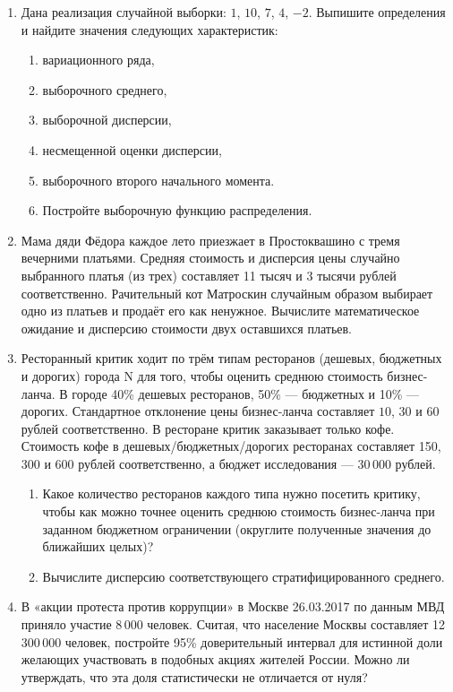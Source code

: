 \documentclass[12pt, a4paper]{article}\usepackage[]{graphicx}\usepackage[]{color}
\begin{document}
		\begin{enumerate}

			\item Дана реализация случайной выборки: $1$, $10$, $7$, $4$, $-2$. Выпишите определения и найдите значения следующих характеристик:
			\begin{enumerate}
				\item вариационного ряда,
				\item выборочного среднего,
				\item выборочной дисперсии,
				\item несмещенной оценки дисперсии,
				\item выборочного второго начального момента.
				\item Постройте выборочную функцию распределения.
			\end{enumerate}


			\item
			Мама дяди Фёдора каждое лето приезжает в Простоквашино с тремя вечерними платьями. Средняя стоимость и дисперсия цены случайно выбранного платья (из трех) составляет 11 тысяч и 3 тысячи рублей соответственно. Рачительный кот Матроскин случайным образом выбирает одно из платьев и продаёт его как ненужное. Вычислите математическое ожидание и дисперсию стоимости двух оставшихся платьев.

			\item
			Ресторанный критик ходит по трём типам ресторанов (дешевых, бюджетных и дорогих) города N для того, чтобы оценить среднюю стоимость бизнес-ланча. В городе 40\%
			дешевых ресторанов, 50\% — бюджетных и 10\% — дорогих. Стандартное отклонение цены бизнес-ланча составляет $10$, $30$ и $60$ рублей соответственно. В ресторане критик заказывает только кофе. Стоимость кофе в дешевых/бюджетных/дорогих ресторанах составляет 150, 300 и 600 рублей соответственно, а бюджет исследования — 30\,000 рублей.
			\begin{enumerate}
				\item Какое количество ресторанов каждого типа нужно посетить критику, чтобы как можно точнее оценить среднюю стоимость бизнес-ланча при заданном бюджетном ограничении (округлите полученные значения до ближайших целых)?
				\item Вычислите дисперсию соответствующего стратифицированного среднего.
			\end{enumerate}

			\item
			В «акции протеста против коррупции» в Москве 26.03.2017 по данным МВД приняло участие 8\,000 человек. Считая, что население Москвы составляет 12\,300\,000 человек, постройте 95\% доверительный интервал для истинной доли желающих участвовать в подобных акциях жителей России. Можно ли утверждать, что эта доля статистически не отличается от нуля?


\end{enumerate}
\end{document}
